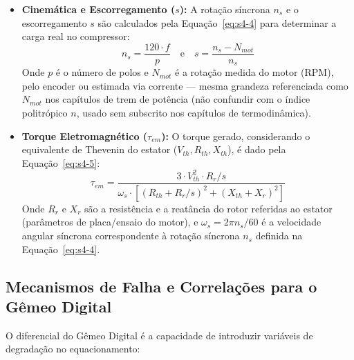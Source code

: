 \documentclass[12pt,a4paper]{article}
\numberwithin{equation}{section}
\numberwithin{table}{section}
\numberwithin{figure}{section}
\begin{document}
	\begin{itemize}
		\item \textbf{Cinemática e Escorregamento ($s$):}
		A rotação síncrona $n_s$ e o escorregamento $s$ são calculados pela Equação~\eqref{eq:s4-4} para determinar a carga real no compressor:
		\begin{equation}\label{eq:s4-4}
 n_s = \frac{120 \cdot f}{p} \quad \text{e} \quad s = \frac{n_s - N_{mot}}{n_s} 
\end{equation}
		Onde $p$ é o número de polos e $N_{mot}$ é a rotação medida do motor (RPM), pelo encoder ou estimada via corrente — mesma grandeza referenciada como $N_{mot}$ nos capítulos de trem de potência (não confundir com o índice politrópico $n$, usado sem subscrito nos capítulos de termodinâmica).
		\item \textbf{Torque Eletromagnético ($\tau_{em}$):}
		O torque gerado, considerando o equivalente de Thevenin do estator ($V_{th}, R_{th}, X_{th}$), é dado pela Equação~\eqref{eq:s4-5}:
		\begin{equation}\label{eq:s4-5}
 \tau_{em} = \frac{3 \cdot V_{th}^2 \cdot R_r / s}{\omega_s \cdot \left[ (R_{th} + R_r / s)^2 + (X_{th} + X_r)^2 \right]} 
\end{equation}
		Onde $R_r$ e $X_r$ são a resistência e a reatância do rotor referidas ao estator (parâmetros de placa/ensaio do motor), e $\omega_s = 2\pi n_s/60$ é a velocidade angular síncrona correspondente à rotação síncrona $n_s$ definida na Equação~\eqref{eq:s4-4}.
	\end{itemize}
	
	\subsection{\textbf{Mecanismos de Falha e Correlações para o Gêmeo Digital}}
	O diferencial do Gêmeo Digital é a capacidade de introduzir variáveis de degradação no equacionamento:
	
\end{document}
